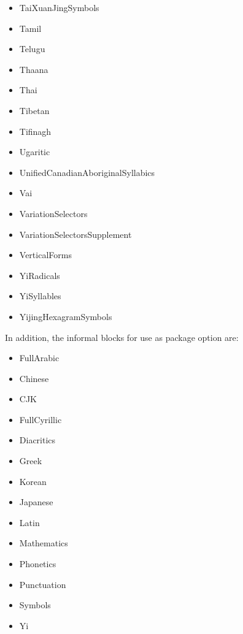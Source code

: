 ﻿\documentclass{article}
\newenvironment{itemlist}{%
  \begin{itemize}
	\setlength{\itemsep}{0pt}
	\setlength{\parsep}{0pt}
	\setlength{\topsep}{0pt}
	\setlength{\partopsep}{0pt}
	\setlength{\parskip}{0pt}
	\setlength{\labelsep}{5pt}}%
{
  \end{itemize}}
\begin{document}
\begin{multicols}{2}
\begin{itemlist}
				\item TaiXuanJingSymbols
				\item Tamil
				\item Telugu
				\item Thaana
				\item Thai
				\item Tibetan
				\item Tifinagh
				\item Ugaritic
				\item UnifiedCanadianAboriginalSyllabics
				\item Vai
				\item VariationSelectors
				\item VariationSelectorsSupplement
				\item VerticalForms
				\item YiRadicals
				\item YiSyllables
				\item YijingHexagramSymbols
			\end{itemlist}
		\end{multicols}

		In addition, the informal blocks for use as package option are:
		
		\begin{itemlist}
			\item FullArabic
			\item Chinese
			\item CJK
			\item FullCyrillic
			\item Diacritics
			\item Greek
			\item Korean
			\item Japanese
			\item Latin
			\item Mathematics
			\item Phonetics
			\item Punctuation
			\item Symbols
			\item Yi
		\end{itemlist}
			
\end{document}
